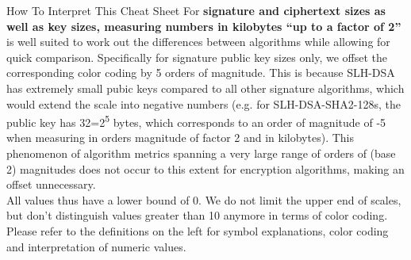 \begin{minipage}[t]{0.58\textwidth}
\begin{algorithmbox}{How To Interpret This Cheat Sheet}
        For {\bfseries signature and ciphertext sizes as well as key sizes, measuring numbers in kilobytes ``up to a factor of 2''} is well suited to work out the differences between algorithms while allowing for quick comparison. Specifically for signature public key sizes only, we offset the corresponding color coding by 5 orders of magnitude. This is because SLH-DSA has extremely small pubic keys compared to all other signature algorithms, which would extend the scale into negative numbers (e.g. for SLH-DSA-SHA2-128s, the public key has 32=2\textsuperscript{5} bytes, which corresponds to an order of magnitude of -5 when measuring in orders magnitude of factor 2 and in kilobytes). This phenomenon of algorithm metrics spanning a very large range of orders of (base 2) magnitudes does not occur to this extent for encryption algorithms, making an offset unnecessary.\\[\baselineskip]

        All values thus have a lower bound of 0. We do not limit the upper end of scales, but don't distinguish values greater than 10 anymore in terms of color coding. Please refer to the definitions on the left for symbol explanations, color coding and interpretation of numeric values.
        \vspace{0.7cm}
    \end{algorithmbox}
\end{minipage}
